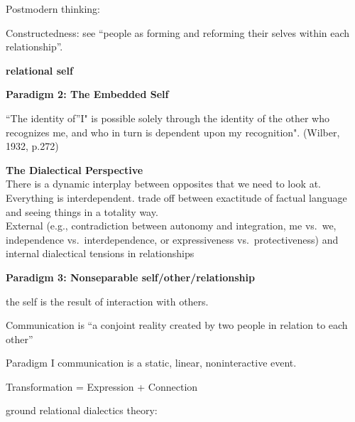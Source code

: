 \documentclass[
]{book}
\begin{document}
Postmodern thinking:

Constructedness: see ``people as forming and reforming their selves within each relationship''.

\textbf{relational self}

\textbf{Paradigm 2: The Embedded Self}

``The identity of''I" is possible solely through the identity of the other who recognizes me, and who in turn is dependent upon my recognition". (Wilber, 1932, p.272)

\textbf{The Dialectical Perspective}\\
There is a dynamic interplay between opposites that we need to look at. Everything is interdependent. trade off between exactitude of factual language and seeing things in a totality way.\\
External (e.g., contradiction between autonomy and integration, me vs.~we, independence vs.~interdependence, or expressiveness vs.~protectiveness) and internal dialectical tensions in relationships

\textbf{Paradigm 3: Nonseparable self/other/relationship}

the self is the result of interaction with others.

Communication is ``a conjoint reality created by two people in relation to each other''

Paradigm I \textbar{} communication is a static, linear, noninteractive event.

Transformation = Expression + Connection

\citep{Baxter_2004}

ground relational dialectics theory:
\end{document}
